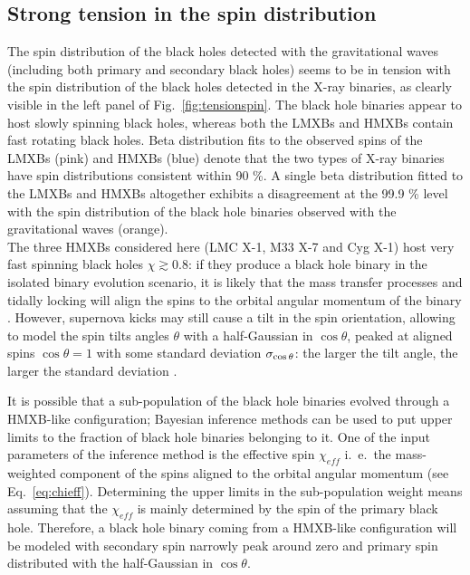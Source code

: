 \documentclass[a4paper,titlepage]{book}     	%
\begin{document}
\subsection{Strong tension in the spin distribution}\label{subsec:tensionspin}
The spin distribution of the black holes detected with the gravitational waves (including both primary and secondary black holes) seems to be in tension with the spin distribution of the black holes detected in the X-ray binaries, as clearly visible in the left panel of Fig.\ \ref{fig:tensionspin}. The black hole binaries appear to host slowly spinning black holes, whereas both the LMXBs and HMXBs contain fast rotating black holes. Beta distribution fits to the observed spins of the LMXBs (pink) and HMXBs (blue) denote that the two types of X-ray binaries have spin distributions consistent within 90 \%. A single beta distribution fitted to the LMXBs and HMXBs altogether exhibits a disagreement at the 99.9 \% level with the spin distribution of the black hole binaries observed with the gravitational waves (orange).\cite{HMXBH_spins2021}\\

The three HMXBs considered here (LMC X-1, M33 X-7 and Cyg X-1) host very fast spinning black holes $\chi \gtrsim 0.8$: if they produce a black hole binary in the isolated binary evolution scenario, it is likely that the mass transfer processes and tidally locking will align the spins to the orbital angular momentum of the binary \cite{Kalogera2000_spinaligned}. However, supernova kicks may still cause a tilt in the spin orientation, allowing to model the spin tilts angles $\theta$ with a half-Gaussian in $\cos \theta$, peaked at aligned spins $\cos \theta = 1$  with some standard deviation $\sigma_{\rm \cos \theta}$: the larger the tilt angle, the larger the standard deviation \cite{spintiltmodel_Talbot2017}. 

It is possible that a sub-population of the black hole binaries evolved through a HMXB-like configuration; Bayesian inference methods can be used to put upper limits to the fraction of black hole binaries belonging to it. One of the input parameters of the inference method is the effective spin $\chi_{eff}$ i.\ e.\ the mass-weighted component of the spins aligned to the orbital angular momentum (see Eq.\ \ref{eq:chieff}). Determining the upper limits in the sub-population weight means assuming that the $\chi_{eff}$ is mainly determined by the spin of the primary black hole. Therefore, a black hole binary coming from a HMXB-like configuration will be modeled with secondary spin narrowly peak around zero and primary spin distributed with the half-Gaussian in $\cos \theta$. 
\end{document}
